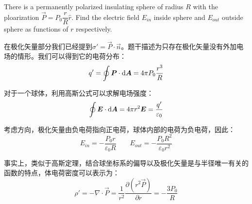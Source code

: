 \begin{solution}[Polarization]
    There is a permanently polarized insulating sphere of radius \( R \) with the ploarization \( \vec{P} = P_0 \dfrac{r}{R}\hat{r} \).
    Find the electric field \( E_{in} \) inside sphere and \( E_{out} \) outside sphere as functions of \( r \) respectively.
    \tcbrule

    在极化矢量部分我们已经提到$\sigma' = \vec{P}\cdot\vec{n}$。题干描述为只存在极化矢量没有外加电场的情形。我们可以得到它的电荷分布：
    \[q' = \oint \vec{P}\cdot \dif \vec{A} = 4\pi P_0 \dfrac{r^3}{R}\]

    对于一个球体，利用高斯公式可以求解电场强度：
    \[\oint \vec{E}\cdot\dif \vec{A} = 4\pi r^2\vec{E} = \dfrac{q'}{\varepsilon_0}\]

    考虑方向，极化矢量由负电荷指向正电荷，球体内部的电荷为负电荷，因此：
    \[E_{in} = -\dfrac{P_0 r}{\varepsilon_0 R}\qquad E_{out} = -\dfrac{P_0 R^2}{\varepsilon_0 r^2}\]

    事实上，类似于高斯定理，结合球坐标系的偏导以及极化矢量是与半径唯一有关的函数的特点，体电荷密度可以表示为：
    \[\rho' = -\nabla\cdot \vec{P} = \dfrac{1}{r^2}\dfrac{\partial (r^2\vec{P})}{\partial r} = -\dfrac{3P_0}{R}\]
\end{solution}

